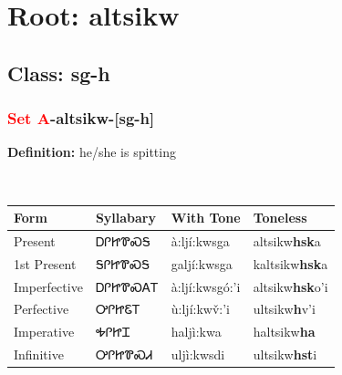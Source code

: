 \needspace{4in}
\section*{Root: altsikw}
\nopagebreak
{}
\needspace{3in}
\subsection*{Class: sg-h}
\nopagebreak
\needspace{2in}
\subsubsection*{\textcolor{Red}{Set A}{-}\textbf{altsikw}{-}[sg-h]}
\nopagebreak
\textbf{Definition: } he/she is spitting
\\[0.5em]
\begin{tabularx}{\textwidth}{l X X X}%
\toprule%
\textbf{Form}&\textbf{Syllabary}&\textbf{With Tone}&\textbf{Toneless}\\%
\midrule%
Present&ᎠᎵᏥᏈᏍᎦ&à:ljí:kwsga&altsikw\textbf{hsk}a\\%
1st Present&ᎦᎵᏥᏈᏍᎦ&galjí:kwsga&kaltsikw\textbf{hsk}a\\%
Imperfective&ᎠᎵᏥᏈᏍᎪᎢ&à:ljí:kwsgó:’i&altsikw\textbf{hsk}o'i\\%
Perfective&ᎤᎵᏥᏋᎢ&ù:ljí:kwv̌:’i&ultsikw\textbf{h}v'i\\%
Imperative&ᎭᎵᏥᏆ&haljì:kwa&haltsikw\textbf{ha}\\%
Infinitive&ᎤᎵᏥᏈᏍᏗ&uljì:kwsdi&ultsikw\textbf{hst}i\\%
\bottomrule%
\end{tabularx}
\\[1em]